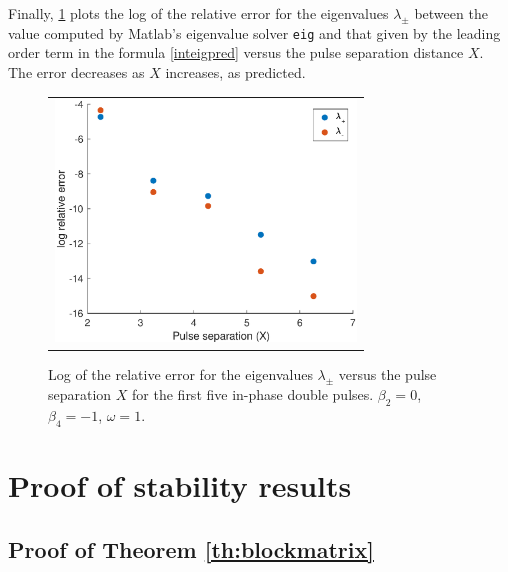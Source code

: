 \documentclass[12pt]{article}
\begin{document}
Finally, \cref{fig:inteigpred} plots the log of the relative error for the eigenvalues $\lambda_\pm$ between the value computed by Matlab's eigenvalue solver \texttt{eig} and that given by the leading order term in the formula \cref{inteigpred} versus the pulse separation distance $X$. The error decreases as $X$ increases, as predicted. 

\begin{figure}[H]
\centering
\begin{tabular}{c}
\includegraphics[width=8cm]{images/inteigpred.eps}
\end{tabular}
\caption{Log of the relative error for the eigenvalues $\lambda_\pm$ versus the pulse separation $X$ for the first five in-phase double pulses. $\beta_2 = 0$, $\beta_4 = -1$, $\omega = 1$.}
\label{fig:inteigpred}
\end{figure}

\appendix

\section{Proof of stability results}

\subsection{Proof of Theorem \ref{th:blockmatrix}}\label{sec:blockmatrixproof}
\end{document}
